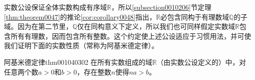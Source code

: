 实数公设保证全体实数构成有序域$\mathbb{R}$，所以\ref{subsection0010206}节定理\ref{thm:theorem0047}的推论\ref{cor:corollary0048}指出，$\mathbb{R}$必包含同构于有理数域$\mathbb{Q}$的子域。因为在第二节里，$\mathbb{Q}$仅在同构意义下定义，所以我们也可同样假定实数域$\mathbb{R}$包含所有有理数，因而包含所有整数。这个约定使上述公设适应于习惯用法，并可使我们证明下面的实数性质（常称为阿基米德定律）。
\begin{theorem}{阿基米德定律}{thm001040302}
在所有实数组成的域$\mathbb{R}$（由实数公设定义的）中，对任意两个数$a > 0$和$b>0$，存在整数$n$使得$na > b$。
\end{theorem}












